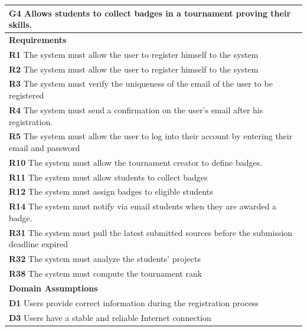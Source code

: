 \begin{table}[H]
    \begin{tabularx}{\textwidth}{X}
        \toprule
        \textbf{G4} Allows students to collect badges in a tournament proving their skills.                                       \\ \midrule
        \textbf{Requirements}                                                                                                        \\ \midrule
        \textbf{R1} The system must allow the user to register himself to the system                                                  \\
        \textbf{R2} The system must allow the user to register himself to the system                                               \\ 
        \textbf{R3} The system must verify the uniqueness of the email of the user to be registered                                        \\ 
        \textbf{R4} The system must send a confirmation on the user's email after his registration.                         \\ 
        \textbf{R5} The system must allow the user to log into their account by entering their email and password           \\ 
        \textbf{R10} The system must allow the tournament creator to define badges.      \\ 
        \textbf{R11} The system must allow students to collect badges        \\ 
        \textbf{R12} The system must assign badges to eligible students          \\  
        \textbf{R14} The system must notify via email students when they are awarded a badge. \\ 
        \textbf{R31} The system must pull the latest submitted sources before the submission deadline expired     \\ 
        \textbf{R32} The system must analyze the students' projects      \\ 
        \textbf{R38} The system must compute the tournament rank                 \\ 
        \midrule
        \textbf{Domain Assumptions}                                                                                                  \\ \midrule
        \textbf{D1} Users provide correct information during the registration process \\          
        \textbf{D3} Users have a stable and reliable Internet connection \\
        \bottomrule
    \end{tabularx}
\end{table}

